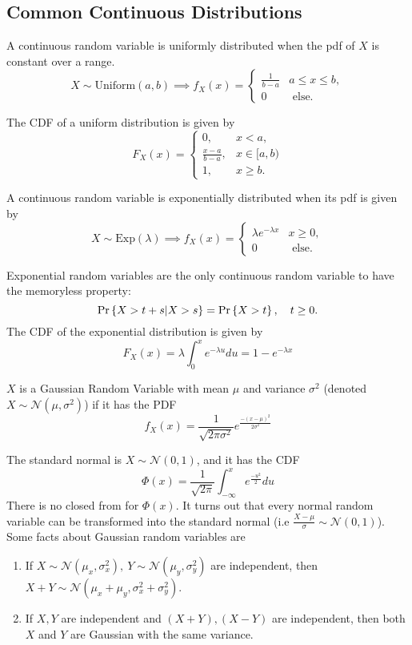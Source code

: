 \subsection{Common Continuous Distributions}
\begin{definition}
  A continuous random variable is uniformly distributed when the pdf of $X$ is constant over a range.
  \[
	X \sim \text{Uniform}(a, b) \implies f_X(x) = \begin{cases}
	  \frac{1}{b-a} & a \leq x \leq b,\\
	  0 & \text{ else.}
	\end{cases}
  \]
  \label{defn:crv-uniform}
\end{definition}
The CDF of a uniform distribution is given by
\[
  F_X(x) = \begin{cases}
	0, &  x < a,\\
	\frac{x-a}{b-a}, & x\in[a, b)\\
	1, & x \geq b.
  \end{cases}
\]
\begin{definition}
  A continuous random variable is exponentially distributed when its pdf is given by
  \[
	X \sim \text{Exp}(\lambda) \implies f_X(x) = \begin{cases}
	  \lambda e^{-\lambda x} & x \geq 0,\\
	  0 & \text{ else.}
	\end{cases}
  \]
  \label{defn:crv-exp}
\end{definition}
Exponential random variables are the only continuous random variable to have the memoryless property:
\[
  \text{Pr}\left\{X > t+s | X > s\right\} = \text{Pr}\left\{X > t\right\}, \quad t \geq 0.
\]
The CDF of the exponential distribution is given by
\[
  F_X(x) = \lambda \int_0^{x}e^{-\lambda u}du = 1 - e^{-\lambda x}
\]
\begin{definition}
  $X$ is a Gaussian Random Variable with mean $\mu$ and variance $\sigma^2$ (denoted $X\sim \mathcal{N}(\mu, \sigma^2)$) if it has the PDF
  \[
	f_X(x) = \frac{1}{\sqrt{2\pi\sigma^2}}e^{\frac{-(x-\mu)^2}{2\sigma^2}}
  \]
  \label{defn:normal-rv}
\end{definition}
The standard normal is $X\sim\mathcal{N}(0, 1)$, and it has the CDF
\[
  \Phi(x) = \frac{1}{\sqrt{2\pi}}\int_{-\infty}^{x}e^{\frac{-u^2}{2}} du
\]
There is no closed from for $\Phi(x)$.
It turns out that every normal random variable can be transformed into the standard normal (i.e $\frac{X - \mu}{\sigma} \sim \mathcal{N}(0, 1)$).
Some facts about Gaussian random variables are
\begin{enumerate}
  \item If $X\sim\mathcal{N}(\mu_x, \sigma_x^2),\ Y\sim\mathcal{N}(\mu_y, \sigma_y^2)$ are independent, then $X+Y \sim \mathcal{N}(\mu_x+\mu_y, \sigma_x^2 + \sigma_y^2)$.
  \item If $X,Y$ are independent and $(X+Y), (X-Y)$ are independent, then both $X$ and $Y$ are Gaussian with the same variance.
\end{enumerate}
